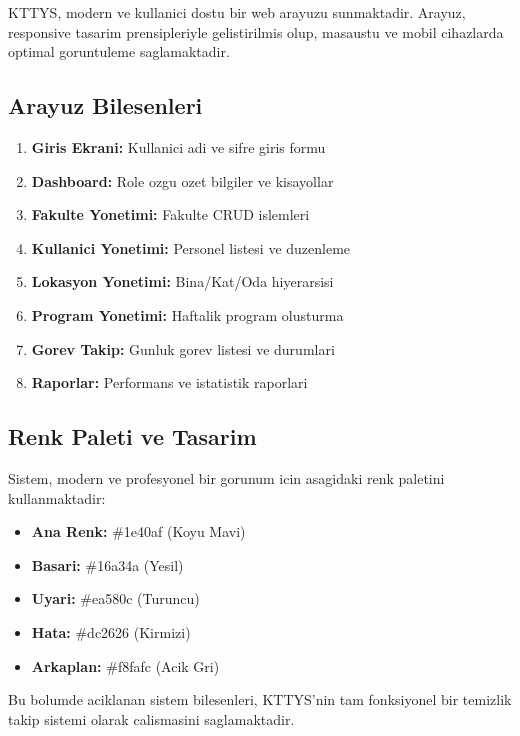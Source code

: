 KTTYS, modern ve kullanici dostu bir web arayuzu sunmaktadir. 
Arayuz, responsive tasarim prensipleriyle gelistirilmis olup, 
masaustu ve mobil cihazlarda optimal goruntuleme saglamaktadir.

\subsection{Arayuz Bilesenleri}
\label{subsec:arayuz-bilesenleri}

\begin{enumerate}
    \item \textbf{Giris Ekrani:} Kullanici adi ve sifre giris formu
    \item \textbf{Dashboard:} Role ozgu ozet bilgiler ve kisayollar
    \item \textbf{Fakulte Yonetimi:} Fakulte CRUD islemleri
    \item \textbf{Kullanici Yonetimi:} Personel listesi ve duzenleme
    \item \textbf{Lokasyon Yonetimi:} Bina/Kat/Oda hiyerarsisi
    \item \textbf{Program Yonetimi:} Haftalik program olusturma
    \item \textbf{Gorev Takip:} Gunluk gorev listesi ve durumlari
    \item \textbf{Raporlar:} Performans ve istatistik raporlari
\end{enumerate}

\subsection{Renk Paleti ve Tasarim}
\label{subsec:tasarim}

Sistem, modern ve profesyonel bir gorunum icin asagidaki 
renk paletini kullanmaktadir:

\begin{itemize}
    \item \textbf{Ana Renk:} \#1e40af (Koyu Mavi)
    \item \textbf{Basari:} \#16a34a (Yesil)
    \item \textbf{Uyari:} \#ea580c (Turuncu)
    \item \textbf{Hata:} \#dc2626 (Kirmizi)
    \item \textbf{Arkaplan:} \#f8fafc (Acik Gri)
\end{itemize}

Bu bolumde aciklanan sistem bilesenleri, KTTYS'nin tam 
fonksiyonel bir temizlik takip sistemi olarak calismasini 
saglamaktadir.
